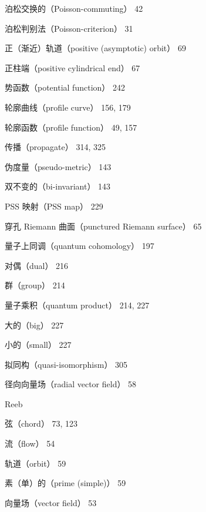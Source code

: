 {\noindent 泊松交换的（Poisson-commuting） 42\par
\noindent 泊松判别法（Poisson-criterion） 31\par
\noindent 正（渐近）轨道（positive (asymptotic) orbit） 69\par
\noindent 正柱端（positive cylindrical end） 67\par
\noindent 势函数（potential function） 242\par
\noindent 轮廓曲线（profile curve） 156, 179\par
\noindent 轮廓函数（profile function） 49, 157\par
\noindent 传播（propagate） 314, 325\par
\noindent 伪度量（pseudo-metric） 143\par
\noindent\hspace*{1.5em}双不变的（bi-invariant） 143\par
\noindent PSS 映射（PSS map） 229\par
\noindent 穿孔 Riemann 曲面（punctured Riemann surface） 65\par
\noindent 量子上同调（quantum cohomology） 197\par
\noindent\hspace*{1.5em}对偶（dual） 216\par
\noindent\hspace*{1.5em}群（group） 214\par
\noindent 量子乘积（quantum product） 214, 227\par
\noindent\hspace*{1.5em}大的（big） 227\par
\noindent\hspace*{1.5em}小的（small） 227\par
\noindent 拟同构（quasi-isomorphism） 305\par
\noindent 径向向量场（radial vector field） 58\par
\noindent Reeb\par
\noindent\hspace*{1.5em}弦（chord） 73, 123\par
\noindent\hspace*{1.5em}流（flow） 54\par
\noindent\hspace*{1.5em}轨道（orbit） 59\par
\noindent\hspace*{3em}素（单）的（prime (simple)） 59\par
\noindent\hspace*{1.5em}向量场（vector field） 53\par
}
